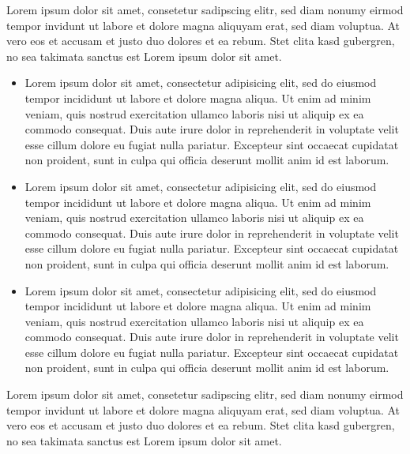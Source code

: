 Lorem ipsum dolor
sit amet,
consetetur
sadipscing elitr,
sed diam nonumy
eirmod tempor
invidunt ut labore
et dolore magna
aliquyam erat, sed
diam voluptua. At
vero eos et accusam
et justo duo
dolores et ea
rebum. Stet clita
kasd gubergren, no
sea takimata
sanctus est Lorem
ipsum dolor sit
amet.
\begin{itemize}
	\item Lorem ipsum dolor
	      sit amet,
	      consectetur
	      adipisicing elit,
	      sed do eiusmod
	      tempor incididunt
	      ut labore et dolore
	      magna aliqua. Ut
	      enim ad minim
	      veniam, quis
	      nostrud
	      exercitation
	      ullamco laboris
	      nisi ut aliquip ex
	      ea commodo
	      consequat. Duis
	      aute irure dolor in
	      reprehenderit in
	      voluptate velit
	      esse cillum dolore
	      eu fugiat nulla
	      pariatur. Excepteur
	      sint occaecat
	      cupidatat non
	      proident, sunt in
	      culpa qui officia
	      deserunt mollit
	      anim id est
	      laborum.
	\item Lorem ipsum dolor
	      sit amet,
	      consectetur
	      adipisicing elit,
	      sed do eiusmod
	      tempor incididunt
	      ut labore et dolore
	      magna aliqua. Ut
	      enim ad minim
	      veniam, quis
	      nostrud
	      exercitation
	      ullamco laboris
	      nisi ut aliquip ex
	      ea commodo
	      consequat. Duis
	      aute irure dolor in
	      reprehenderit in
	      voluptate velit
	      esse cillum dolore
	      eu fugiat nulla
	      pariatur. Excepteur
	      sint occaecat
	      cupidatat non
	      proident, sunt in
	      culpa qui officia
	      deserunt mollit
	      anim id est
	      laborum.
	\item Lorem ipsum dolor
	      sit amet,
	      consectetur
	      adipisicing elit,
	      sed do eiusmod
	      tempor incididunt
	      ut labore et dolore
	      magna aliqua. Ut
	      enim ad minim
	      veniam, quis
	      nostrud
	      exercitation
	      ullamco laboris
	      nisi ut aliquip ex
	      ea commodo
	      consequat. Duis
	      aute irure dolor in
	      reprehenderit in
	      voluptate velit
	      esse cillum dolore
	      eu fugiat nulla
	      pariatur. Excepteur
	      sint occaecat
	      cupidatat non
	      proident, sunt in
	      culpa qui officia
	      deserunt mollit
	      anim id est
	      laborum.
\end{itemize}
Lorem ipsum dolor sit amet, consetetur sadipscing elitr, sed diam nonumy
eirmod tempor invidunt ut labore et dolore magna aliquyam erat, sed diam
voluptua. At vero eos et accusam et justo duo dolores et ea rebum. Stet clita
kasd gubergren, no sea takimata sanctus est Lorem ipsum dolor sit amet.
